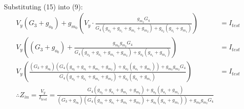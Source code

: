 \begin{enumerate}
\begin{align*}
      \end{align*}
      Substituting (15) into (9):
      \begin{align*}
        V_{y}(G_3 + g_{o_0}) + g_{m_0}\left(V_{y} \cdot \frac{g_{m_2}G_4}{G_4(g_{o_2} + g_{o_1} + g_{m_1} + g_{m_2}) + g_{o_2}(g_{o_1} + g_{m_1})}\right) &= I_{test} \\
        V_{y}\left((G_3 + g_{o_0}) + \frac{g_{m_0}g_{m_2}G_4}{G_4(g_{o_2} + g_{o_1} + g_{m_1} + g_{m_2}) + g_{o_2}(g_{o_1} + g_{m_1})}\right) &= I_{test} \\
        V_{y}\left(\frac{(G_3 + g_{o_0})(G_4(g_{o_2} + g_{o_1} + g_{m_1} + g_{m_2}) + g_{o_2}(g_{o_1} + g_{m_1})) + g_{m_0}g_{m_2}G_4}{G_4(g_{o_2} + g_{o_1} + g_{m_1} + g_{m_2}) + g_{o_2}(g_{o_1} + g_{m_1})}\right) &= I_{test} \\
        \therefore Z_{in} = \frac{V_{y}}{I_{test}} = \frac{G_4(g_{o_2} + g_{o_1} + g_{m_1} + g_{m_2}) + g_{o_2}(g_{o_1} + g_{m_1})}{(G_3 + g_{o_0})(G_4(g_{o_2} + g_{o_1} + g_{m_1} + g_{m_2}) + g_{o_2}(g_{o_1} + g_{m_1})) + g_{m_0}g_{m_2}G_4}
      \end{align*}

\end{enumerate}
